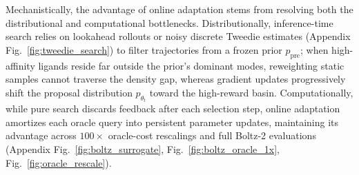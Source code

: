 \documentclass{article}
\begin{document}
Mechanistically, the advantage of online adaptation stems from resolving both the distributional and computational bottlenecks. Distributionally, inference-time search relies on lookahead rollouts or noisy discrete Tweedie estimates (Appendix Fig.~\ref{fig:tweedie_search}) to filter trajectories from a frozen prior $p_{\text{pre}}$; when high-affinity ligands reside far outside the prior's dominant modes, reweighting static samples cannot traverse the density gap, whereas gradient updates progressively shift the proposal distribution $p_{\theta_t}$ toward the high-reward basin. Computationally, while pure search discards feedback after each selection step, online adaptation amortizes each oracle query into persistent parameter updates, maintaining its advantage across $100\times$ oracle-cost rescalings and full Boltz-2 evaluations (Appendix Fig.~\ref{fig:boltz_surrogate}, Fig.~\ref{fig:boltz_oracle_1x}, Fig.~\ref{fig:oracle_rescale}).


\end{document}
